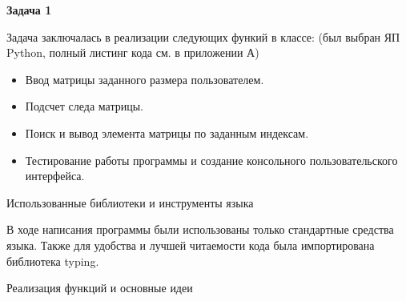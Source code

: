 \begin{Large} 
	\textbf{Задача 1}\\
	
	 \end{Large} 
Задача заключалась в реализации следующих функий в классе: (был выбран ЯП Python, полный листинг кода см. в приложении А)
\begin{itemize}
	\item Ввод матрицы заданного размера пользователем.
	\item Подсчет следа матрицы.
	\item Поиск и вывод элемента матрицы по заданным индексам.
	\item Тестирование работы программы и создание консольного пользовательского интерфейса.\\
\end{itemize}

\begin{large}
	Использованные библиотеки и инструменты языка\\
\end{large}
В ходе написания программы были использованы только стандартные средства языка. Также для удобства и лучшей читаемости кода была импортирована библиотека typing.\\

\begin{large}
	Реализация функций и основные идеи\\
\end{large}




